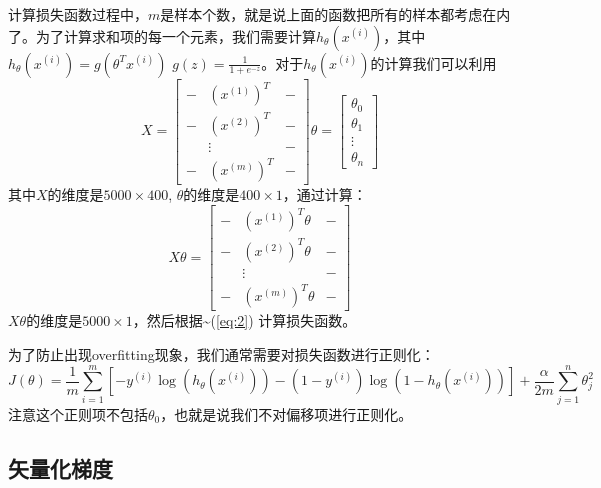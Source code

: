 \documentclass[10pt,a4paper,UTF8]{article}
\begin{document}
计算损失函数过程中，\(m\)是样本个数，就是说上面的函数把所有的样本都考虑在内了。为了计算求和项的每一个元素，我们需要计算\(h_{\theta}(x^{(i)})\)，其中\(h_{\theta}(x^{(i)}) = g(\theta^{T}x^{(i)})\) \(g(z) = \frac{1}{1+e^{-z}}\)。对于\(h_{\theta}(x^{(i)})\)的计算我们可以利用
\begin{equation}
\label{eq:3}
X =
\begin{bmatrix}
- & (x^{(1)})^{T} & - \\
- & (x^{(2)})^{T} & - \\
    &    \vdots     & - \\
- & (x^{(m)})^{T} & -
\end{bmatrix}
\theta =
\begin{bmatrix}
\theta_{0} \\ \theta_{1} \\ \vdots \\ \theta_{n}
\end{bmatrix}
\end{equation}
其中\(X\)的维度是\(5000\times 400\), \(\theta\)的维度是\(400\times 1\)，通过计算：
\begin{equation}
\label{eq:5}
X\theta =
\begin{bmatrix}
- & (x^{(1)})^{T}\theta & - \\
- & (x^{(2)})^{T}\theta & - \\
    &    \vdots     & - \\
- & (x^{(m)})^{T}\theta & -
\end{bmatrix}
\end{equation}
\(X\theta\)的维度是\(5000\times 1\)，然后根据\textasciitilde{}(\ref{eq:2}) 计算损失函数。

为了防止出现overfitting现象，我们通常需要对损失函数进行正则化：
\begin{equation}
\label{eq:6}
J(\theta) = \frac{1}{m} \sum_{i=1}^{m} [ -y^{(i)}\log (h_{\theta}(x^{(i)})) - (1-y^{(i)})\log(1-h_{\theta}(x^{(i)})) ] + \frac{\alpha}{2m} \sum_{j=1}^{n}\theta_{j}^{2}
\end{equation}
注意这个正则项不包括\(\theta_{0}\)，也就是说我们不对偏移项进行正则化。
\subsection{矢量化梯度}
\label{sec:org1678f36}
\end{document}
